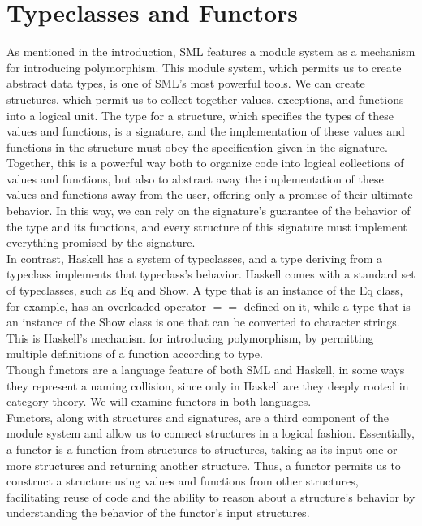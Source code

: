 \documentclass[journal]{IEEEtran}
\begin{document}
\section{Typeclasses and Functors}
As mentioned in the introduction, SML features a module system as a mechanism for introducing polymorphism. This module system, which permits us to create abstract data types, is one of SML's most powerful tools. We can create structures, which permit us to collect together values, exceptions, and functions into a logical unit. The type for a structure, which specifies the types of these values and functions, is a signature, and the implementation of these values and functions in the structure must obey the specification given in the signature. Together, this is a powerful way both to organize code into logical collections of values and functions, but also to abstract away the implementation of these values and functions away from the user, offering only a promise of their ultimate behavior. In this way, we can rely on the signature's guarantee of the behavior of the type and its functions, and every structure of this signature must implement everything promised by the signature.\\

In contrast, Haskell has a system of typeclasses, and a type deriving from a typeclass implements that typeclass's behavior. Haskell comes with a standard set of typeclasses, such as Eq and Show. A type that is an instance of the Eq class, for example, has an overloaded operator $==$ defined on it, while a type that is an instance of the Show class is one that can be converted to character strings. This is Haskell's mechanism for introducing polymorphism, by permitting multiple definitions of a function according to type.\\

Though functors are a language feature of both SML and Haskell, in some ways they represent a naming collision, since only in Haskell are they deeply rooted in category theory. We will examine functors in both languages.\\

Functors, along with structures and signatures, are a third component of the module system and allow us to connect structures in a logical fashion. Essentially, a functor is a function from structures to structures, taking as its input one or more structures and returning another structure. Thus, a functor permits us to construct a structure using values and functions from other structures, facilitating reuse of code and the ability to reason about a structure's behavior by understanding the behavior of the functor's input structures.\\
\end{document}
